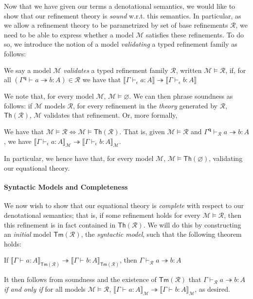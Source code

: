 \documentclass[acmsmall,screen,review]{acmart}
\newcommand{\mc}[1]{\ensuremath{\mathcal{#1}}}
\newcommand{\mb}[1]{\ensuremath{\mathbf{#1}}}
\newcommand{\ms}[1]{\ensuremath{\mathsf{#1}}}
\newcommand{\hasty}[4]{#1 \vdash_{#2} #3: {#4}}
\newcommand{\tref}{\twoheadrightarrow}
\newcommand{\cref}{\twoheadrightarrow}
\newcommand{\tmle}[5]{#1 \vdash_{#2} #3 \tref #4 : {#5}}
\newcommand{\dnt}[1]{\llbracket{#1}\rrbracket}
\begin{document}
Now that we have given our terms a denotational semantics, we would like to show that our refinement
theory is \emph{sound} w.r.t. this semantics. In particular, as we allow a refinement theory to be
parametrized by set of base refinements $\mc{R}$, we need to be able to express whether a model
$\mc{M}$ satisfies these refinements. To do so, we introduce the notion of a model \emph{validating}
a typed refinement family as follows:
\begin{definition}
  We say a model $\mc{M}$ \emph{validates} a typed refinement family $\mc{R}$, written $\mc{M}
  \models \mc{R}$, if, for all
  $
  (\tmle{\Gamma^{\mb{q}}}{}{a}{b}{A}) \in \mc{R}
  $
  we have that
  $
  \dnt{\hasty{\Gamma}{\epsilon}{a}{A}} \tref \dnt{\hasty{\Gamma}{\epsilon}{b}{A}}
  $
\end{definition}
We note that, for every model $\mc{M}$, $\mc{M} \models \varnothing$. We can then phrase soundness
as follows: if $\mc{M}$ models $\mc{R}$, for every refinement in the \emph{theory} generated by
$\mc{R}$, $\ms{Th}(\mc{R})$, $\mc{M}$ validates that refinement. Or, more formally,
\begin{theorem}[Soundness]
  We have that $\mc{M} \models \mc{R} \iff \mc{M} \models \ms{Th}(\mc{R})$. That is, given $\mc{M}
  \models \mc{R}$ and $\tmle{\Gamma^{\mb{q}}}{\mc{R}}{a}{b}{A}$, we have
  $\dnt{\hasty{\Gamma}{\epsilon}{a}{A}}_{\mc{M}} \cref
  \dnt{\hasty{\Gamma}{\epsilon}{b}{A}}_{\mc{M}}$.
\end{theorem}
In particular, we hence have that, for every model $\mc{M}$, $\mc{M} \models \ms{Th}(\varnothing)$,
validating our equational theory.

\paragraph{Syntactic Models and Completeness}

We now wish to show that our equational theory is \emph{complete} with respect to our denotational
semantics; that is, if some refinement holds for every $\mc{M} \models \mc{R}$, then this refinement
is in fact contained in $\ms{Th}(\mc{R})$. We will do this by constructing an \emph{initial} model
$\ms{Tm}(\mc{R})$, the \emph{syntactic model}, such that the following theorem holds:
\begin{theorem}[Completeness]
  If $\dnt{\hasty{\Gamma}{}{a}{A}}_{\ms{Tm}(\mc{R})} \tref
  \dnt{\hasty{\Gamma}{}{b}{A}}_{\ms{Tm}(\mc{R})}$, then
  $
  \tmle{\Gamma}{\mc{R}}{a}{b}{A}
  $
\end{theorem}
It then follows from soundness and the existence of $\ms{Tm}(\mc{R})$ that
$\tmle{\Gamma}{\mc{R}}{a}{b}{A}$ \emph{if and only if} for all models $\mc{M} \models \mc{R}$,
$\dnt{\hasty{\Gamma}{}{a}{A}}_{\mc{M}} \tref \dnt{\hasty{\Gamma}{}{b}{A}}_{\mc{M}}$, as desired.
\end{document}
